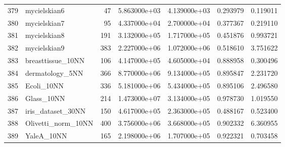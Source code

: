 \begin{tabular}{llrrrrr}
379 &             mycielskian6 &    47 &  5.863000e+03 &  4.139000e+03 &  0.293979 &   0.119011 \\
380 &             mycielskian7 &    95 &  4.337000e+04 &  2.700000e+04 &  0.377367 &   0.219110 \\
381 &             mycielskian8 &   191 &  3.132000e+05 &  1.717000e+05 &  0.451876 &   0.993721 \\
382 &             mycielskian9 &   383 &  2.227000e+06 &  1.072000e+06 &  0.518610 &   3.751622 \\
383 &        breasttissue\_10NN &   106 &  4.147000e+05 &  4.605000e+04 &  0.888958 &   0.300496 \\
384 &          dermatology\_5NN &   366 &  8.770000e+06 &  9.134000e+05 &  0.895847 &   2.231720 \\
385 &               Ecoli\_10NN &   336 &  5.181000e+06 &  5.434000e+05 &  0.895106 &   2.496580 \\
386 &               Glass\_10NN &   214 &  1.473000e+07 &  3.134000e+05 &  0.978730 &   1.019550 \\
387 &        iris\_dataset\_30NN &   150 &  4.617000e+05 &  2.363000e+05 &  0.488167 &   0.523400 \\
388 &       Olivetti\_norm\_10NN &   400 &  3.756000e+06 &  3.668000e+05 &  0.902332 &   6.360955 \\
389 &               YaleA\_10NN &   165 &  2.198000e+06 &  1.707000e+05 &  0.922321 &   0.703458 \\
\bottomrule
\end{tabular}
